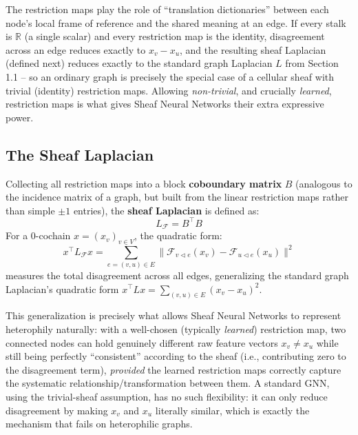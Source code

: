 \documentclass[12pt,a4paper]{article}
\begin{document}
\begin{keyidea}
The restriction maps play the role of ``translation dictionaries'' between each node's local frame of reference and the shared meaning at an edge. If every stalk is $\mathbb{R}$ (a single scalar) and every restriction map is the identity, disagreement across an edge reduces exactly to $x_v - x_u$, and the resulting sheaf Laplacian (defined next) reduces exactly to the standard graph Laplacian $L$ from Section 1.1 -- so an ordinary graph is precisely the special case of a cellular sheaf with trivial (identity) restriction maps. Allowing \emph{non-trivial}, and crucially \emph{learned}, restriction maps is what gives Sheaf Neural Networks their extra expressive power.
\end{keyidea}

\subsection{The Sheaf Laplacian}

\begin{defbox}
Collecting all restriction maps into a block \textbf{coboundary matrix} $B$ (analogous to the incidence matrix of a graph, but built from the linear restriction maps rather than simple $\pm 1$ entries), the \textbf{sheaf Laplacian} is defined as:
\[
L_{\mathcal{F}} = B^\top B
\]
For a $0$-cochain $x = (x_v)_{v\in V}$, the quadratic form:
\[
x^\top L_{\mathcal{F}} x = \sum_{e=(v,u)\in E} \big\| \mathcal{F}_{v \triangleleft e}(x_v) - \mathcal{F}_{u \triangleleft e}(x_u) \big\|^2
\]
measures the total disagreement across all edges, generalizing the standard graph Laplacian's quadratic form $x^\top L x = \sum_{(v,u)\in E}(x_v - x_u)^2$.
\end{defbox}

\begin{keyidea}
This generalization is precisely what allows Sheaf Neural Networks to represent heterophily naturally: with a well-chosen (typically \emph{learned}) restriction map, two connected nodes can hold genuinely different raw feature vectors $x_v \neq x_u$ while still being perfectly ``consistent'' according to the sheaf (i.e., contributing zero to the disagreement term), \emph{provided} the learned restriction maps correctly capture the systematic relationship/transformation between them. A standard GNN, using the trivial-sheaf assumption, has no such flexibility: it can only reduce disagreement by making $x_v$ and $x_u$ literally similar, which is exactly the mechanism that fails on heterophilic graphs.
\end{keyidea}
\end{document}
